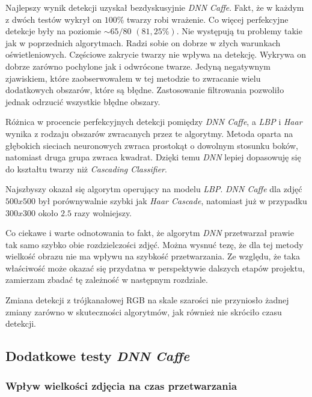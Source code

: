 \par
Najlepszy wynik detekcji uzyskał bezdyskusyjnie \textit{DNN Caffe}. Fakt, że w każdym z dwóch testów wykrył on $100 \%$ twarzy robi wrażenie. Co więcej perfekcyjne detekcje były na poziomie $\sim65/80$ $(81,25 \%)$. Nie występują tu problemy takie jak w poprzednich algorytmach. Radzi sobie on dobrze w złych warunkach oświetleniowych. Częściowe zakrycie twarzy nie wpływa na detekcję. Wykrywa on dobrze zarówno pochylone jak i odwrócone twarze. Jedyną negatywnym zjawiskiem, które zaobserwowałem w tej metodzie to zwracanie wielu dodatkowych obszarów, które są błędne. Zastosowanie filtrowania pozwoliło jednak odrzucić wszystkie błędne obszary.

\vspace{5mm}
Różnica w procencie perfekcyjnych detekcji pomiędzy \textit{DNN Caffe}, a \textit{LBP} i \textit{Haar} wynika z rodzaju obszarów zwracanych przez te algorytmy. Metoda oparta na głębokich sieciach neuronowych zwraca prostokąt o dowolnym stosunku boków, natomiast druga grupa zwraca kwadrat. Dzięki temu \textit{DNN} lepiej dopasowuję się do kształtu twarzy niż \textit{Cascading Classifier}.

\vspace{5mm}

Najszbyszy okazał się algorytm operujący na modelu \textit{LBP}. \textit{DNN Caffe} dla zdjęć $500x500$  był porównywalnie szybki jak \textit{Haar Cascade}, natomiast już w przypadku $300x300$ około $2.5$ razy wolniejszy.
\par
Co ciekawe i warte odnotowania to fakt, że algorytm \textit{DNN} przetwarzał prawie tak samo szybko obie rozdzielczości zdjęć. Można wysnuć tezę, że dla tej metody wielkość obrazu nie ma wpływu na szybkość przetwarzania. Ze względu, że taka właściwość może okazać się przydatna w perspektywie dalszych etapów projektu, zamierzam zbadać tę zależność w następnym rozdziale.

\vspace{5mm}

Zmiana detekcji z trójkanałowej RGB na skale szarości nie przyniosło żadnej zmiany zarówno w skuteczności algorytmów, jak również nie skróciło czasu detekcji.

\subsection{Dodatkowe testy \textit{DNN Caffe}}

\subsubsection{Wpływ wielkości zdjęcia na czas przetwarzania}

